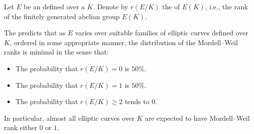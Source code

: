 \begin{conjecture}  \label{conjecture:minimalist_conjecture_for_mordell_weil_ranks_of_elliptic_curves_over_global_fields}
    Let $E$ be an  defined over a  $K$. Denote by $r(E/K)$ the  of $E(K)$, i.e., the rank of the finitely generated abelian group $E(K)$.  

    The  predicts that as $E$ varies over suitable families of elliptic curves defined over $K$, ordered in some appropriate manner, the distribution of the Mordell--Weil ranks is minimal in the sense that:
    \begin{itemize}
        \item The probability that $r(E/K) = 0$ is $50\%$.
        \item The probability that $r(E/K) = 1$ is $50\%$.
        \item The probability that $r(E/K) \geq 2$ tends to $0$.
    \end{itemize}

    In particular, almost all elliptic curves over $K$ are expected to have Mordell--Weil rank either $0$ or $1$.  
\end{conjecture}